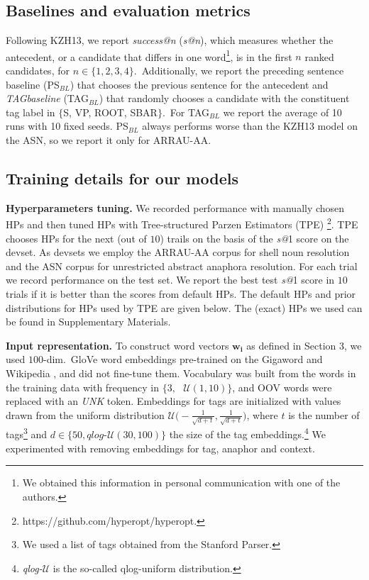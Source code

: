 \documentclass[11pt,letterpaper]{article}
\begin{document}
\subsection{Baselines and evaluation metrics}

Following KZH13, we report {\em success@n} (\textit{s@n}), which measures whether the antecedent, or a candidate that differs in one word\footnote{We obtained this information in personal communication with one of the authors.}, is in the first $n$ ranked candidates, for $n \in \{1, 2, 3, 4\}$.\ Additionally, we report the preceding sentence baseline (PS$_{BL}$) that chooses the previous sentence for the antecedent and {\em TAGbaseline} (TAG$_{BL}$) that randomly chooses a candidate with the constituent tag label in $\{$S, VP, ROOT, SBAR$\}$.\ For TAG$_{BL}$
we report the average of 10 runs with 10 fixed seeds. PS$_{BL}$ always performs worse than the KZH13 model on the ASN, so we report it only for ARRAU-AA.



\subsection{Training details for our models}

\textbf{Hyperparameters tuning.} We recorded performance with manually chosen HPs and then tuned HPs with Tree-structured Parzen Estimators (TPE) \cite{Bergstra2011AlgorithmsFH}\footnote{https://github.com/hyperopt/hyperopt.}. TPE chooses HPs for the next (out of $10$) trails on the basis of the {\em s@}1 score on the devset.
As devsets we employ the ARRAU-AA corpus for shell noun resolution and the ASN corpus for unrestricted abstract anaphora resolution. For each trial we record performance on the test set. We report the best test {\em s@}1 score in $10$ trials if it is better than the scores from default HPs. The default HPs and prior distributions for HPs used by TPE are given below. The (exact) HPs we used can be found in Supplementary Materials.  

\textbf{Input representation.} To construct word vectors $\boldsymbol{w_i}$ as defined in Section 3, we used $100$-dim.\ GloVe word embeddings pre-trained on the Gigaword and Wikipedia \cite{pennington2014glove}, and did not fine-tune them. Vocabulary was built from the words in the training data with frequency in $\{3, \text{ }\mathcal{U}(1,10)\}$, and OOV words were replaced with an \textit{UNK} token. Embeddings for tags are initialized with values drawn from the uniform distribution $\mathcal{U} \big(-\frac{1}{\sqrt{d + t}}, \frac{1}{\sqrt{d+t}}\big)$, where $t$ is the number of tags\footnote{We used a list of tags obtained from the Stanford Parser.} and $d \in \{50, \textit{qlog-}\mathcal{U}(30,100)\}$ the size of the tag embeddings.\footnote{\textit{qlog-}$\mathcal{U}$ is the so-called qlog-uniform distribution.} We experimented with removing embeddings for tag, anaphor and context. 
\end{document}
